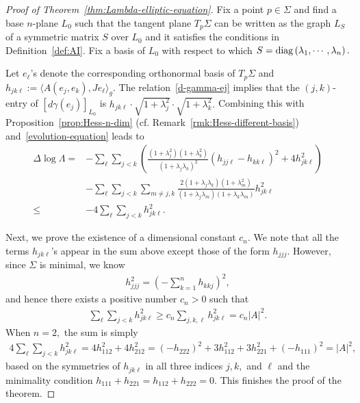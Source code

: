 \documentclass[11pt]{amsart}
\numberwithin{equation}{section}
\theoremstyle{definition}
\theoremstyle{definition}
\newcommand{\pair}[1]{\langle #1\rangle}
\newcommand{\pr}[1]{\left(#1\right)}
\newcommand{\D}{\Delta}
\begin{document}
\begin{proof}
	[Proof of Theorem~\ref{thm:Lambda-elliptic-equation}]
	Fix a point $p\in\Sigma$ and find a base $n$-plane $L_0$ such that the tangent plane $T_p\Sigma$ can be written as the graph $L_S$ of a symmetric matrix $S$ over $L_0$ and it satisfies the conditions in Definition~\ref{def:AI}.
	Fix a basis of $L_0$ with respect to which $S={\rm diag}\pr{\lambda_1,\cdots,\lambda_n}.$ 
    
	Let $e_\ell$'s denote the corresponding orthonormal basis of $T_p\Sigma$ and  $h_{jk\ell}:=\pair{A(e_j,e_k),Je_{\ell}}_g.$
	The relation~\eqref{d-gamma-ej} implies that the $(j,k)$-entry of $[d\gamma\pr{e_j}]_{L_0}$ is
    $h_{jk\ell}
	\cdot \sqrt{1+\lambda_j^2}
	\cdot \sqrt{1+\lambda_k^2}.$
	Combining this with Proposition~\ref{prop:Hess-n-dim} (cf. Remark~\ref{rmk:Hess-different-basis}) and~\eqref{evolution-equation} leads to
	\begin{align*}
	\D\log\Lambda
	= & 
	-\sum_\ell \sum_{j<k} \pr{ \frac{\pr{1+\lambda_j^2}\pr{1+\lambda_k^2}}
		{(1+\lambda_j\lambda_k)^2} 
		\pr{h_{jj\ell}-h_{kk\ell}}^2
		+ 4 h_{jk\ell}^2}\\
	& - \sum_\ell\sum_{j<k} 
	\sum_{m\neq j,k} 
	\frac{2(1+\lambda_j\lambda_k)(1+\lambda_m^2)}
	{(1+\lambda_j\lambda_m)(1+\lambda_k\lambda_m)}
	h_{jk\ell}^2\\
	\le & -4\sum_\ell\sum_{j<k}h_{jk\ell}^2.
	\end{align*}
	
	Next, we prove the existence of a dimensional constant $c_n.$
	We note that all the terms $h_{jk\ell}$'s appear in the sum above except those of the form $h_{jjj}.$
	However, since $\Sigma$ is minimal, we know
	\begin{align*}
	h_{jjj}^2
	= \pr{-\sum_{k=1}^n h_{kkj}}^2,
	\end{align*}
	and hence there exists a positive number $c_n>0$ such that
	\begin{align*}
	\sum_\ell\sum_{j<k}h_{jk\ell}^2
	\ge c_n \sum_{j,k,\ell} h_{jk\ell}^2
	= c_n|A|^2.
	\end{align*}
	When $n=2,$ the sum is simply
	\begin{align*}
	4\sum_\ell\sum_{j<k}h_{jk\ell}^2
	= 4h_{112}^2 + 4h_{212}^2
	= \pr{-h_{222}}^2 + 3 h_{112}^2
	+ 3h_{221}^2 + \pr{-h_{111}}^2
	= |A|^2,
	\end{align*}
    based on the symmetries of $h_{jk\ell}$ in all three indices $j,k,$ and $\ell$ and the minimality condition $h_{111}+h_{221}=h_{112}+h_{222}=0.$
	This finishes the proof of the theorem.
\end{proof}
\end{document}
